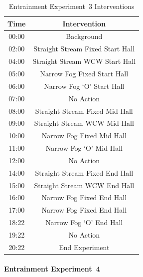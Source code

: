 \documentclass[12pt,oneside]{book}
\begin{document}

\begin{table}[H]
	\centering
	\caption{Entrainment Experiment~3 Interventions}
	\begin{tabular}{|c|c|} 
		\hline
		Time 	& 	Intervention 	\\ \hline \hline
		00:00 	&	Background 	\\ \hline
		02:00 	&	Straight Stream Fixed Start Hall 	\\ \hline
		04:00 	&	Straight Stream WCW Start Hall 	\\ \hline
		05:00 	&	Narrow Fog Fixed Start Hall 	\\ \hline
		06:00 	&	Narrow Fog `O' Start Hall 	\\ \hline
		07:00 	&	No Action 	\\ \hline
		08:00 	&	Straight Stream Fixed Mid Hall 	\\ \hline
		09:00 	&	Straight Stream WCW Mid Hall 	\\ \hline
		10:00 	&	Narrow Fog Fixed Mid Hall 	\\ \hline
		11:00 	&	Narrow Fog `O' Mid Hall 	\\ \hline
		12:00 	&	No Action 	\\ \hline
		14:00 	&	Straight Stream Fixed End Hall 	\\ \hline
		15:00 	&	Straight Stream WCW End Hall 	\\ \hline
		16:00 	&	Narrow Fog Fixed End Hall 	\\ \hline
		17:00 	&	Narrow Fog Fixed End Hall 	\\ \hline
		18:22 	&	Narrow Fog `O' End Hall 	\\ \hline
		19:22 	&	No Action 	\\ \hline
		20:22 	&	End Experiment 	\\ \hline
	\end{tabular}
	\label{Table:EntExp3_Interventions}
\end{table}

\FloatBarrier

\paragraph{Entrainment Experiment~4} \mbox{}

\end{document}
